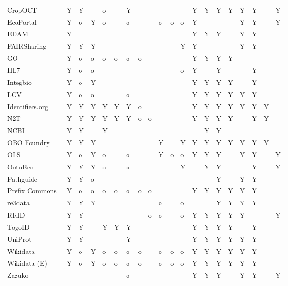 \begin{table}
\begin{tabular}{llllllllllllllllllll}
CropOCT~\cite{Arnaud2020} & Y & Y &  & o &  & Y &  &  &  &  &  & Y & Y & Y & Y & Y & Y &  & Y \\
EcoPortal~\cite{Kechagioglou2021} & Y & o & Y & o &  & o &  &  & o & o & o & Y &  &  &  & Y & Y &  & Y \\
EDAM~\cite{Ison2013} & Y &  &  &  &  &  &  &  &  &  &  & Y & Y & Y &  & Y & Y &  &  \\
FAIRSharing~\cite{Sansone2019} & Y & Y & Y &  &  &  &  &  &  &  & Y & Y &  &  &  & Y & Y &  &  \\
GO~\cite{TheGeneOntologyConsortium2019} & Y & o & o & o & o & o & o &  &  &  &  & Y & Y & Y & Y &  &  &  &  \\
HL7~\cite{Bender2013} & Y & o & o &  &  &  &  &  &  &  & o & Y &  & Y &  &  & Y &  &  \\
Integbio & Y & o & Y &  &  &  &  &  &  &  &  & Y & Y & Y & Y &  & Y &  &  \\
LOV & Y & o & o &  &  & o &  &  &  &  &  & Y & Y & Y & Y & Y & Y &  &  \\
Identifiers.org~\cite{Juty2012} & Y & Y & Y & Y & Y & Y & o &  &  &  &  & Y & Y & Y & Y & Y & Y & Y &  \\
N2T~\cite{Wimalaratne2018} & Y & Y & Y & Y & Y & Y & o & o &  &  &  & Y & Y & Y & Y &  & Y & Y &  \\
NCBI~\cite{Clark2016} & Y & Y &  & Y &  &  &  &  &  &  &  &  & Y & Y &  &  &  &  &  \\
OBO Foundry~\cite{Jackson2021} & Y & Y & Y &  &  &  &  &  & Y &  & Y & Y & Y & Y & Y & Y & Y & Y &  \\
OLS~\cite{Cote2006a} & Y & o & Y & o &  & o &  &  & Y & o & o & Y & Y & Y &  & Y & Y &  & Y \\
OntoBee~\cite{Ong2017} & Y & Y & Y & o &  & o &  &  &  &  & Y &  & Y & Y &  &  & Y &  & Y \\
Pathguide & Y & Y & o &  &  &  &  &  &  &  &  &  &  & Y &  & Y & Y &  &  \\
Prefix Commons~\cite{prefixcommons} & Y & o & o & o & o & o & o & o &  &  &  & Y & Y & Y & Y & Y & Y &  &  \\
re3data~\cite{Pampel2013} & Y & Y & Y &  &  &  &  &  & o &  & o &  &  & Y & Y & Y & Y &  &  \\
RRID & Y & Y &  &  &  &  &  & o & o &  & o & Y & Y & Y & Y & Y &  &  & Y \\
TogoID & Y & Y &  & Y & Y & Y &  &  &  &  &  & Y & Y & Y & Y &  & Y &  &  \\
UniProt~\cite{Bateman2021} & Y & Y &  &  &  & Y &  &  &  &  &  & Y & Y & Y & Y & Y & Y &  &  \\
Wikidata~\cite{Waagmeester2020} & Y & o & Y & o & o & o & o &  & o & o & o & Y & Y & Y & Y & Y & Y &  &  \\
Wikidata (E)~\cite{Waagmeester2020} & Y & o & Y & o & o & o & o &  & o & o & o & Y & Y & Y & Y & Y & Y &  &  \\
Zazuko &  &  &  &  &  & o &  &  &  &  &  & Y & Y & Y &  & Y & Y &  & Y \\
\bottomrule
\end{tabular}
\end{table}
